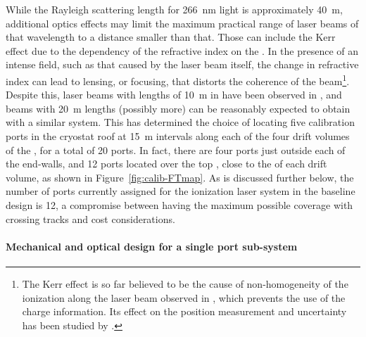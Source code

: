 While the Rayleigh scattering length for \SI{266}{\nano\m}  light is approximately \SI{40}{\m}, additional optics effects may limit the maximum practical range of laser beams of that wavelength to a distance smaller than that. Those can include the Kerr effect  due to the dependency of the refractive index on the \efield. In the presence of an intense field, such as that caused by the laser beam itself, the change in refractive index can lead to lensing, or focusing, that distorts the coherence of the beam\footnote{The Kerr effect is so far believed to be the cause of non-homogeneity of the ionization along the laser beam observed in , which prevents the use of the charge information. Its effect on the position measurement and \efield uncertainty has been studied by .}. 
Despite this, laser beams with lengths of \SI{10}{\m} in  have been observed in , and beams with \SI{20}{\m} lengths (possibly more) can be reasonably expected to obtain with a similar system.
This has determined the choice of locating five calibration ports in the cryostat roof at \SI{15}{\m} intervals along each of the four drift volumes of the , for a total of \num{20} ports. In fact, there are four ports just outside each of the  end-walls, and \num{12} ports located over the top , close to the  of each drift volume, as shown in Figure~\ref{fig:calib-FTmap}. As is discussed further below, the number of ports %
currently assigned for the ionization laser system in the baseline design is \num{12}, a compromise between having the maximum possible coverage with crossing tracks and cost considerations.

\paragraph{Mechanical and optical design for a single port sub-system}

